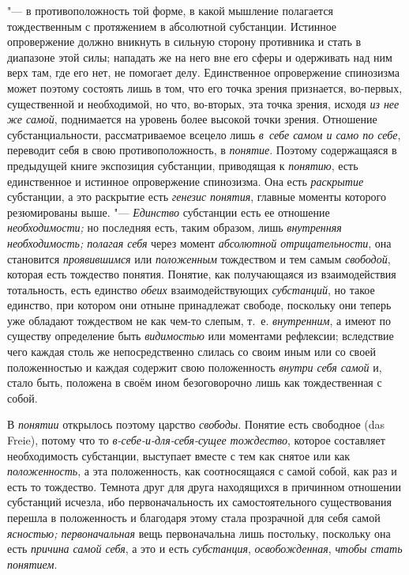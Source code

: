 "--- в противоположность той форме, в какой мышление полагается
тождественным с протяжением в абсолютной субстанции. Истинное опровержение
должно вникнуть в сильную сторону противника и стать в
диапазоне этой силы; нападать же на него вне его сферы и одерживать над ним
верх там, где его нет, не помогает делу. Единственное опровержение
спинозизма может поэтому состоять лишь в том, что его точка зрения
признается, во-первых, существенной и необходимой, но что, во-вторых, эта
точка зрения, исходя {\em из нее же самой}, поднимается на уровень более
высокой точки зрения. Отношение субстанциальности, рассматриваемое всецело
лишь {\em в~себе самом и само по себе}, переводит себя в свою
противоположность, в {\em понятие}. Поэтому содержащаяся в предыдущей книге
экспозиция субстанции, приводящая к {\em понятию}, есть единственное и
истинное опровержение спинозизма. Она есть {\em раскрытие} субстанции, а это
раскрытие есть {\em генезис понятия}, главные моменты которого резюмированы
выше. "--- {\em Единство} субстанции есть ее отношение {\em необходимости;}
но последняя есть, таким образом, лишь {\em внутренняя необходимость;
полагая себя} через момент {\em абсолютной отрицательности}, она
становится {\em проявившимся} или {\em положенным} тождеством и тем самым
{\em свободой}, которая есть тождество понятия. Понятие, как получающаяся из
взаимодействия тотальность, есть единство {\em обеих} взаимодействующих
{\em субстанций}, но такое единство, при котором они отныне принадлежат
свободе, поскольку они теперь уже обладают тождеством не как чем-то слепым,
т.~е. {\em внутренним}, а имеют по существу определение быть {\em видимостью}
или моментами рефлексии; вследствие чего каждая столь же непосредственно
слилась со своим иным или со своей положенностью и каждая содержит свою
положенность {\em внутри себя самой} и, стало быть, положена в своём ином
безоговорочно лишь как тождественная с собой.

В {\em понятии} открылось поэтому царство {\em свободы}. Понятие есть
свободное (das Freie), потому что то {\em в-себе-и-для-себя-сущее тождество},
которое составляет необходимость субстанции, выступает вместе с тем как
снятое или как {\em положенность}, а эта положенность, как соотносящаяся с
самой собой, как раз и есть то тождество. Темнота друг для друга находящихся
в причинном отношении субстанций исчезла, ибо первоначальность их
самостоятельного существования перешла в положенность и благодаря этому
стала прозрачной для себя самой {\em ясностью; первоначальная}
вещь
первоначальна лишь постольку, поскольку она есть {\em причина самой себя},
а это и есть {\em субстанция}, {\em освобожденная}, {\em чтобы стать понятием}.

